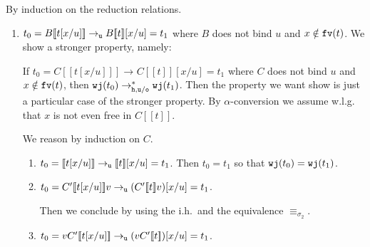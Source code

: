 \documentclass{LMCS}
\renewcommand{\>}{\rightarrow}
\def\sig{\sigma}
\newcommand{\Rew}[1]{\rightarrow_{#1}}
\newcommand{\Rewnmod}[2]{\rightarrow^*_{#1/#2}}
\newcommand{\isubs}[1]{ \{ #1  \} }
\newcommand{\dis}{{\tt j}}
\newcommand{\fv}[1]{{\tt fv}(#1)}
\newcommand{\proj}{\wfc}
\newcommand{\Gc}{{\tt w}}
\newcommand{\ih}{i.h.}
\newcommand{\wfc}{\Gc\dis}
\newcommand{\unboxed}{{\tt u}}
\newcommand{\ignore}[1]{}
\newcommand{\osym}{{\tt o}}
\newcommand{\New}{{\tt h}}
\newcommand{\ctx}[2]{#1 [ \! [#2] \! ]}
\begin{document}
\proof
By induction on the reduction relations. 
\begin{enumerate}[$\bullet$]
\item $t_0 = \ctx{B}{t[x/u]} \Rew{\unboxed}
  \ctx{B}{t}[x/u]= t_1$  where $B$ does not
  bind $u$  and $x \notin \fv{t}$.  We show a stronger property, namely: 

 If $t_0 = \ctx{C}{t[x/u]} \Rew{}
  \ctx{C}{t}[x/u]= t_1$  where $C$ does not
  bind $u$ and $x \notin \fv{t}$, then $\proj(t_0)  \Rewnmod{\New,\unboxed}{\osym}  \proj(t_1)$.   
Then the property we want show is just a particular case of the stronger property. By $\alpha$-conversion
  we assume w.l.g. 
  that
  $x$ is not even free in $\ctx{C}{t}$.

We reason by induction on $C$.
  \begin{enumerate}[$-$]
    \item $t_0 = \ctx{}{t[x/u]} \Rew{\unboxed} \ctx{}{t}[x/u]
        = t_1$. Then $t_0 = t_1$ so that $\proj(t_0) = \proj(t_1)$. 
    \item $t_0 = \ctx{C'}{t[x/u]} v\Rew{\unboxed} (\ctx{C'}{t} v)[x/u]
        = t_1$.  
       \ignore{We have $\proj(t_0) = \proj(\ctx{C'}{t[x/u]}) \proj(v)
        \Rewnmod{\New,\unboxed}{\osym}(\ih)\ \proj(\ctx{C'}{t} [x/u]) \proj(v)$.

        If $x \notin \fv{\ctx{C'}{t}}$, then: 
        \[ \begin{array}{ll}   
         \proj(t_0) = \proj(\ctx{C'}{t} [x/u]) \proj(v) =  \\
         \proj(\ctx{C'}{t}) [x/\proj(u)] \proj(v) \equiv_{\sig_2}\\
         (\proj(\ctx{C'}{t})\proj(v)) [x/\proj(u)]  = \proj(t_1)
         \end{array} \] 
      
        If $x \in \fv{\ctx{C'}{t}}$, then: 
        \[ \begin{array}{ll} 
           \proj(\ctx{C'}{t} [x/u]) \proj(v) =  \\
         \proj(\ctx{C'}{t}) \isubs{x/\proj(u)} \proj(v) = \\
         (\proj(\ctx{C'}{t})\proj(v)) \isubs{x/\proj(u)}  = \proj(t_1) 
         \end{array} \]  
      }
       Then we conclude by using the \ih\ and the
        equivalence $\equiv_{\sig_2}$. 
      
      \item $t_0 = v \ctx{C'}{t[x/u]} \Rew{\unboxed} (v \ctx{C'}{t})[x/u] = t_1$.  
        \ignore{We have 
        $\proj(t_0) = \proj(v)\proj(\ctx{C'}{t[x/u]}) 
        \Rewnmod{\New,\unboxed}{\osym} (\ih)\ 
        \proj(v) \proj(\ctx{C'}{t}[x/u])$. 

}
\end{enumerate}
\end{enumerate}
\end{document}

